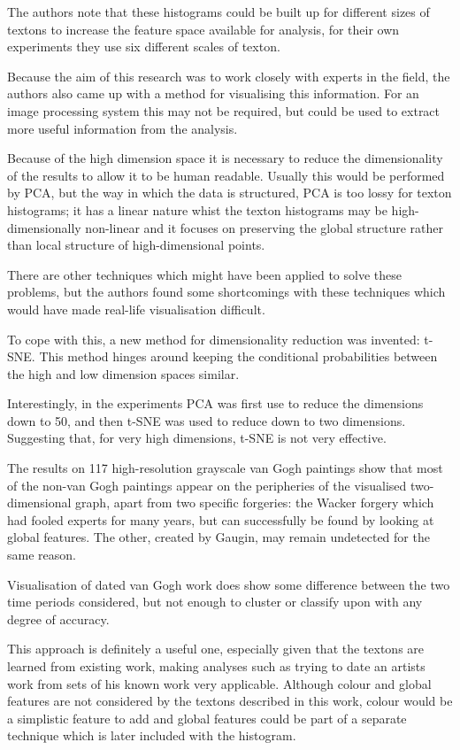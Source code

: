\documentclass[conference]{IEEEtran}
\begin{document}
The authors note that these histograms could be built up for different sizes of
textons to increase the feature space available for analysis, for their own
experiments they use six different scales of texton.

Because the aim of this research was to work closely with experts in the field,
the authors also came up with a method for visualising this information. For an
image processing system this may not be required, but could be used to extract
more useful information from the analysis.

Because of the high dimension space it is necessary to reduce the
dimensionality of the results to allow it to be human readable. Usually this
would be performed by \gls{PCA}, but the way in which the data is structured,
\gls{PCA} is too lossy for texton histograms; it has a linear nature whist the
texton histograms may be high-dimensionally non-linear and it focuses on
preserving the global structure rather than local structure of high-dimensional
points.

There are other techniques which might have been applied to solve these
problems, but the authors found some shortcomings with these techniques which
would have made real-life visualisation difficult.

To cope with this, a new method for dimensionality reduction was invented:
\gls{t-SNE}. This method hinges around keeping
the conditional probabilities between the high and low dimension spaces
similar.

Interestingly, in the experiments \gls{PCA} was first use to reduce the
dimensions down to 50, and then \gls{t-SNE} was
used to reduce down to two dimensions. Suggesting that, for very high dimensions,
\gls{t-SNE} is not very effective.

The results on 117 high-resolution grayscale van Gogh paintings show that most
of the non-van Gogh paintings appear on the peripheries of the visualised
two-dimensional graph, apart from two specific forgeries: the Wacker forgery
which had fooled experts for many years, but can successfully be found by
looking at global features. The other, created by Gaugin, may remain undetected
for the same reason.

Visualisation of dated van Gogh work does show some difference between the two
time periods considered, but not enough to cluster or classify upon with any
degree of accuracy.


This approach is definitely a useful one, especially given that the textons are
learned from existing work, making analyses such as trying to date an artists
work from sets of his known work very applicable. Although colour and global
features are not considered by the textons described in this work, colour would
be a simplistic feature to add and global features could be part of a separate
technique which is later included with the histogram.
\end{document}
